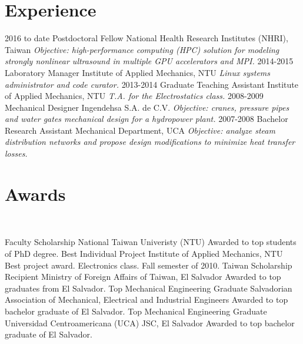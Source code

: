 \documentclass[a4paper]{friggeri-cv}
\begin{document}
\section{Experience}
\vspace{-2mm}
\begin{entrylist}
  \entry
    {2016 to date}
    {Postdoctoral Fellow}
    {National Health Research Institutes (NHRI), Taiwan}
    {\emph{Objective: high-performance computing (HPC) solution for modeling strongly nonlinear ultrasound in multiple GPU accelerators and MPI.}}
  \entry
    {2014-2015}
    {Laboratory Manager}
    {Institute of Applied Mechanics, NTU}
    {\emph{Linux systems administrator and code curator.}}
  \entry
    {2013-2014}
    {Graduate Teaching Assistant}
    {Institute of Applied Mechanics, NTU}
    {\emph{T.A. for the Electrostatics class.}}
  \entry
    {2008-2009}
    {Mechanical Designer}
    {Ingendehsa S.A. de C.V.}
    {\emph{Objective: cranes, pressure pipes and water gates mechanical design for a hydropower plant.}}
  \entry
    {2007-2008}
    {Bachelor Research Assistant}
    {Mechanical Department, UCA}
    {\emph{Objective: analyze steam distribution networks and propose design modifications to minimize heat transfer losses.}}
\end{entrylist}

\newpage

\section{Awards}
~
\begin{entrylist}
    {Faculty Scholarship}
    {National Taiwan Univeristy (NTU)}
    {Awarded to top students of PhD degree.}
    {Best Individual Project}
    {Institute of Applied Mechanics, NTU}
    {Best project award. Electronics class. Fall semester of 2010.}
    {Taiwan Scholarship Recipient}
    {Ministry of Foreign Affairs of Taiwan, El Salvador} 
    {Awarded to top graduates from El Salvador.}
    {Top Mechanical Engineering Graduate}
    {Salvadorian Association of Mechanical, Electrical and Industrial Engineers}
    {Awarded to top bachelor graduate of El Salvador.}
    {Top Mechanical Engineering Graduate}
    {Universidad Centroamericana (UCA) JSC, El Salvador}
    {Awarded to top bachelor graduate of El Salvador.}
\end{entrylist}
\end{document}

